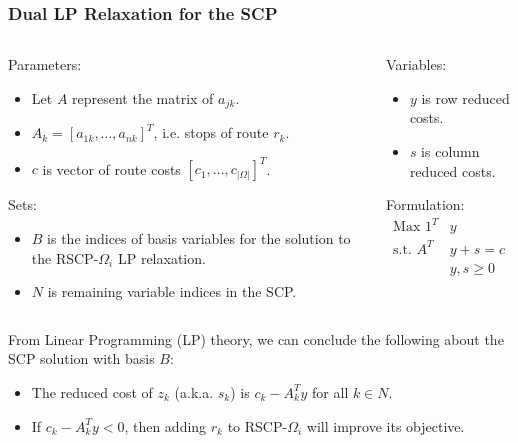 \documentclass{beamer}
\begin{document}
	\begin{frame}[t]
		\frametitle{Dual LP Relaxation for the SCP}
		\small
		\begin{columns}[T]
			\begin{column}{0.6\textwidth}
				Parameters:
				\begin{itemize}
					\item Let $ A $ represent the matrix of $ a_{jk} $.
					\item $ A_k = [a_{1k}, ..., a_{nk}]^T $, i.e. stops of route $ r_k $.
					\item $ c $ is vector of route costs $ [c_1, ..., c_{|\Omega|}]^T $.
				\end{itemize}
				Sets:
				\begin{itemize}
					\item $ B $ is the indices of basis variables for the solution to the RSCP-$ \Omega_i $ LP relaxation.
					\item $ N $ is remaining variable indices in the SCP.
				\end{itemize}
			\end{column}
			\begin{column}{0.4\textwidth}
				Variables:
				\begin{itemize}
					\item $ y $ is row reduced costs.
					\item $ s $ is column reduced costs.
				\end{itemize}
				Formulation:
				\begin{align*}
					\text{Max } 1^T &y  \\
					\text{s.t. } A^T &y + s = c \\
					&y, s \geq 0
				\end{align*}
			\end{column}
		\end{columns}
		\vspace{0cm}
		\begin{block}{}
			From Linear Programming (LP) theory, we can conclude the following about the SCP solution with basis $ B $:
			\begin{itemize}
				\item The reduced cost of $ z_k $ (a.k.a. $ s_k $) is $ c_k - A^T_k y $ for all $ k \in N $.
				\item If $ c_k - A^T_k y < 0 $, then adding $ r_k $ to RSCP-$ \Omega_i $ will improve its objective.
			\end{itemize}
		\end{block}
		\normalsize
	\end{frame}
\end{document}
